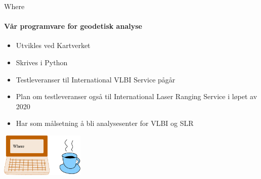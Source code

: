 \documentclass[12pt,table,t]{beamer}
\begin{document}
\begin{frame}{Where}
  \framesubtitle{Vår programvare for geodetisk analyse}
  \begin{itemize}
    \item Utvikles ved Kartverket
    \item Skrives i Python
    \item Testleveranser til International VLBI Service pågår
    \item Plan om testleveranser også til International Laser Ranging Service i løpet av 2020
    \item Har som målsetning å bli analysesenter for VLBI og SLR
  \end{itemize}
  \begin{center}
    \includegraphics[width=0.3\textwidth]{figure/where.eps}
  \end{center}
\end{frame}
\end{document}
